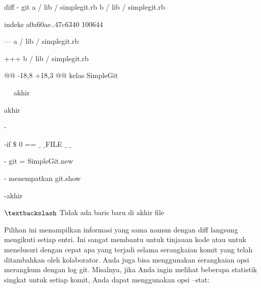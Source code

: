 \vspace{12pt}
\vspace{12pt}
\vspace{12pt}
\noindent 
 \hspace*{0.5in}  \hspace*{0.5in} diff - git a / lib / simplegit.rb b / lib / simplegit.rb \par
\noindent 
 \hspace*{0.5in}  \hspace*{0.5in} indeks a0a60ae..47c6340 100644 \par
\noindent 
 \hspace*{0.5in}  \hspace*{0.5in} --- a / lib / simplegit.rb \par
\noindent 
 \hspace*{0.5in}  \hspace*{0.5in} +++ b / lib / simplegit.rb \par
\noindent 
 \hspace*{0.5in}  \hspace*{0.5in} @@ -18,8 +18,3 @@ kelas SimpleGit \par
\noindent 
 \hspace*{0.5in}  \hspace*{0.5in}  $  $ $  $ $  $ $  $ $  $akhir \par
\noindent 
 \hspace*{0.5in}  $  $akhir \par
\noindent 
 \hspace*{0.5in} - \par
\noindent 
 \hspace*{0.5in} -if  $  \$  $ 0 ==  $  \_  $ $  \_  $FILE $  \_  $ $  \_  $ \par
\noindent 
 \hspace*{0.5in} - git = SimpleGit.new \par
\noindent 
 \hspace*{0.5in} - menempatkan git.show \par
\noindent 
 \hspace*{0.5in} -akhir \par
\noindent 
 \hspace*{0.5in}  $  \textbackslash  $ Tidak ada baris baru di akhir file \par
\vspace{12pt}
\noindent 
 \hspace*{0.5in} Pilihan ini menampilkan informasi yang sama namun dengan diff langsung mengikuti setiap entri. Ini sangat membantu untuk tinjauan kode atau untuk menelusuri dengan cepat apa yang terjadi selama serangkaian komit yang telah ditambahkan oleh kolaborator. Anda juga bisa menggunakan serangkaian opsi merangkum dengan log git. Misalnya, jika Anda ingin melihat beberapa statistik singkat untuk setiap komit, Anda dapat menggunakan opsi --stat: \par
